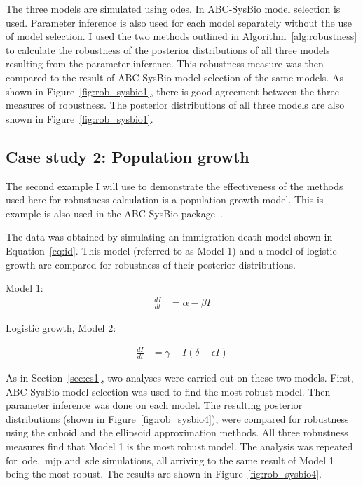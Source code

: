 \noindent The three models are simulated using \acrshort{ode}s. In ABC-SysBio model selection is used. Parameter inference is also used for each model separately without the use of model selection. I used the two methods outlined in Algorithm~\ref{alg:robustness} to calculate the robustness of the posterior distributions of all three models resulting from the parameter inference. This robustness measure was then compared to the result of ABC-SysBio model selection of the same models. As shown in Figure~\ref{fig:rob_sysbio1}, there is good agreement between the three measures of robustness. The posterior distributions of all three models are also shown in Figure~\ref{fig:rob_sysbio1}.

\subsection{Case study 2: Population growth}
\label{sec:cs2}
The second example I will use to demonstrate the effectiveness of the methods used here for robustness calculation is a population growth model. This is example is also used in the ABC-SysBio package~\autocite{Toni:2009tr}.

The data was obtained by simulating an immigration-death model shown in Equation~\ref{eq:id}. This model (referred to as Model 1) and a model of logistic growth are compared for robustness of their posterior distributions.
 
Model 1:
\begin{align}
  \frac{dI}{dt} &= \alpha - \beta I \label{eq:id}
\end{align}

\noindent Logistic growth, Model 2:

\begin{align}
  \frac{dI}{dt} &= \gamma - I	(\delta - \epsilon I)
\end{align}


\noindent As in Section~\ref{sec:cs1}, two analyses were carried out on these two models. First, ABC-SysBio model selection was used to find the most robust model. Then parameter inference was done on each model. The resulting posterior distributions (shown in Figure~\ref{fig:rob_sysbio4}), were compared for robustness using the cuboid and the ellipsoid approximation methods. All three robustness measures find that Model 1 is the most robust model. The analysis was repeated for~\acrshort{ode},~\acrfull{mjp} and~\acrfull{sde} simulations, all arriving to the same result of Model 1 being the most robust. The results are shown in Figure~\ref{fig:rob_sysbio4}.



